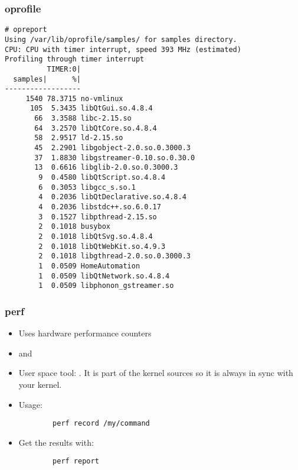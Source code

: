 \begin{frame}[fragile]
\frametitle{oprofile}
\begin{block}{}
\tiny
\begin{verbatim}
# opreport
Using /var/lib/oprofile/samples/ for samples directory.
CPU: CPU with timer interrupt, speed 393 MHz (estimated)
Profiling through timer interrupt
          TIMER:0|
  samples|      %|
------------------
     1540 78.3715 no-vmlinux
      105  5.3435 libQtGui.so.4.8.4
       66  3.3588 libc-2.15.so
       64  3.2570 libQtCore.so.4.8.4
       58  2.9517 ld-2.15.so
       45  2.2901 libgobject-2.0.so.0.3000.3
       37  1.8830 libgstreamer-0.10.so.0.30.0
       13  0.6616 libglib-2.0.so.0.3000.3
        9  0.4580 libQtScript.so.4.8.4
        6  0.3053 libgcc_s.so.1
        4  0.2036 libQtDeclarative.so.4.8.4
        4  0.2036 libstdc++.so.6.0.17
        3  0.1527 libpthread-2.15.so
        2  0.1018 busybox
        2  0.1018 libQtSvg.so.4.8.4
        2  0.1018 libQtWebKit.so.4.9.3
        2  0.1018 libgthread-2.0.so.0.3000.3
        1  0.0509 HomeAutomation
        1  0.0509 libQtNetwork.so.4.8.4
        1  0.0509 libphonon_gstreamer.so
\end{verbatim}
\end{block}
\end{frame}

\begin{frame}[fragile]
\frametitle{perf}
\begin{itemize}
	\item Uses hardware performance counters
	\item {} and 
	\item User space tool: . It is part of the kernel
		sources so it is always in sync with your kernel.
	\item Usage:
	\begin{block}{}
	\begin{verbatim}
		perf record /my/command
	\end{verbatim}
	\end{block}
	\item Get the results with:
	\begin{block}{}
	\begin{verbatim}
		perf report
	\end{verbatim}
	\end{block}
\end{itemize}
\end{frame}

